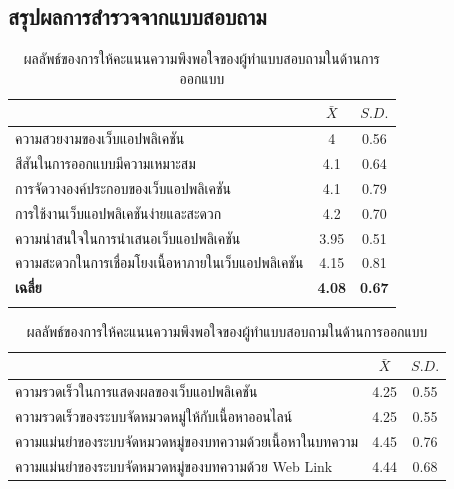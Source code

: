 \documentclass[12pt,oneside,openright,a4paper]{cpe-thai-project}
\begin{document}
\begin{itemize}
\begin{enumerate}
    \subsection{สรุปผลการสำรวจจากแบบสอบถาม}
      \begin{longtable}{lcc}
        \caption{ผลลัพธ์ของการให้คะแนนความพึงพอใจของผู้ทำแบบสอบถามในด้านการออกแบบ}
        \label{tbl:design_score}\\
        \hhline{===}
        \multicolumn{1}{c}{\textbf{หัวข้อ}}                & \textbf{$\bar{X}$} & \textbf{$S.D.$} \\ \hline
        \endhead
        ความสวยงามของเว็บแอปพลิเคชัน                       & 4          & 0.56          \\
        สีสันในการออกแบบมีความเหมาะสม                      & 4.1        & 0.64          \\
        การจัดวางองค์ประกอบของเว็บแอปพลิเคชัน              & 4.1        & 0.79          \\
        การใช้งานเว็บแอปพลิเคชันง่ายและสะดวก               & 4.2        & 0.70          \\
        ความน่าสนใจในการนำเสนอเว็บแอปพลิเคชัน              & 3.95       & 0.51          \\
        ความสะดวกในการเชื่อมโยงเนื้อหาภายในเว็บแอปพลิเคชัน & 4.15       & 0.81          \\ \hline
        \textbf{เฉลี่ย}                                    & \textbf{4.08}        & \textbf{0.67}     \\ \hhline{===}    
      \end{longtable}
      \begin{longtable}{lcc}
        \caption{ผลลัพธ์ของการให้คะแนนความพึงพอใจของผู้ทำแบบสอบถามในด้านการออกแบบ}
        \label{tbl:eff_score}\\
        \hhline{===}
        \multicolumn{1}{c}{\textbf{หัวข้อ}}                & \textbf{$\bar{X}$} & \textbf{$S.D.$} \\ \hline
        \endhead
        ความรวดเร็วในการแสดงผลของเว็บแอปพลิเคชัน                        & 4.25          & 0.55          \\
        ความรวดเร็วของระบบจัดหมวดหมู่ให้กับเนื้อหาออนไลน์                   & 4.25        & 0.55          \\
        ความแม่นยำของระบบจัดหมวดหมู่ของบทความด้วยเนื้อหาในบทความ         & 4.45        & 0.76          \\
        ความแม่นยำของระบบจัดหมวดหมู่ของบทความด้วย Web Link             & 4.44        & 0.68          \\

\end{longtable}
\end{enumerate}
\end{itemize}
\end{document}
